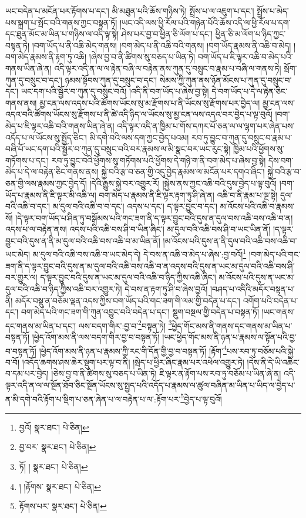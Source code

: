 ཡང་བདེན་པ་མངོན་པར་རྟོགས་པ་དང་། མི་མཐུན་པའི་ཆོས་གཉིས་ཏེ། སྤྲོས་པ་ལ་འཇུག་པ་དང་། སྤྲོས་པ་མེད་པས་སྐྲག་པ་སྤོང་བའི་གནས་ཀྱང་བསྟན་ཏོ། །ཡང་འདི་ལས་ཕྱི་རོལ་པའི་གཉེན་པོའི་ཆོས་འདི་ལ་ཕྱི་རོལ་པ་དག་དང་ཐུན་མོང་མ་ཡིན་པ་གཉིས་ལ་འདི་ལྟ་སྟེ། ཤེས་པར་བྱ་བ་ཕྱིན་ཅི་ལོག་པ་དང་། ཕྱིན་ཅི་མ་ལོག་པ་ཉིད་ཀྱང་བསྟན་ཏེ། །བག་ཡོད་པ་ནི་འཆི་མེད་གནས། །བག་མེད་པ་ནི་འཆི་བའི་གནས། །བག་ཡོད་རྣམས་ནི་འཆི་བ་མེད། །བག་མེད་རྣམས་ནི་རྟག་ཏུ་འཆི། །ཞེས་བྱ་བ་ནི་ཚིགས་སུ་བཅད་པ་ཡིན་ཏེ། བག་ཡོད་པ་ཇི་ལྟར་འཆི་བ་མེད་པའི་གནས་ཡིན་ཞེ་ན། འདི་ལྟར་འདི་ན་ལ་ལ་རྟེན་བཞི་ལ་བརྟེན་ནས་ཀུན་དུ་བསྲུང་བ་རྣམ་པ་བཞི་ལ་གནས་ཏེ། སྲོག་ཀུན་དུ་བསྲུང་བ་དང་། ཉམས་སྟོབས་ཀུན་དུ་བསྲུང་བ་དང་། སེམས་ཀྱི་ཀུན་ནས་ཉོན་མོངས་པ་ཀུན་དུ་བསྲུང་བ་དང་། ཡང་དག་པའི་སྦྱོར་བ་ཀུན་དུ་བསྲུང་བའོ། །འདི་ནི་བག་ཡོད་པ་ཞེས་བྱ་སྟེ། དེ་བག་ཡོད་པ་དེ་ལ་རྟེན་ཅིང་གནས་ནས། མྱ་ངན་ལས་འདས་པའི་ཚོགས་ཡོངས་སུ་མ་རྫོགས་པ་ནི་ཡོངས་སུ་རྫོགས་པར་བྱེད་ལ། མྱ་ངན་ལས་འདའ་བའི་ཚོགས་ཡོངས་སུ་རྫོགས་པ་ནི་ཚེ་འདི་ཉིད་ལ་ཡོངས་སུ་མྱ་ངན་ལས་འདའ་བར་བྱེད་པ་ལྟ་བུའོ། །བག་མེད་པ་ཇི་ལྟར་འཆི་བའི་གནས་ཡིན་ཞེ་ན། འདི་ལྟར་འདི་ན་ཁྱིམ་པ་གོས་དཀར་པོ་ཅན་ལ་ལ་ལྷག་པར་ཞེན་པས་འདོད་པ་ལ་ཡོངས་སུ་སྤྱོད་ཅིང་། མི་དགེ་བའི་ལས་དག་ཀྱང་བྱེད་པའམ། རབ་ཏུ་བྱུང་བ་ཀུན་དུ་བསྲུང་བ་རྣམ་པ་བཞི་པོ་ཡང་དག་པའི་སྦྱོར་བ་ཀུན་དུ་བསྲུང་བའི་བར་རྣམས་ལ་མི་སྣང་བར་ཡང་རུང་སྟེ། ཁྱིམ་པའི་ཕྱོགས་སུ་གཏོགས་པ་དང་། རབ་ཏུ་བྱུང་བའི་ཕྱོགས་སུ་གཏོགས་པའི་ཕྱོགས་དེ་གཉི་ག་ནི་བག་མེད་པ་ཞེས་བྱ་སྟེ། དེས་བག་མེད་པ་དེ་ལ་བརྟེན་ཅིང་གནས་ནས། སྐྱེ་བའི་རྩ་བ་ཅན་གྱི་འདུ་བྱེད་རྣམས་ལ་མངོན་པར་དགའ་ཞིང་། སྐྱེ་བའི་རྩ་བ་ཅན་གྱི་ལས་རྣམས་ཀྱང་བྱེད་དོ། །དེའི་རྒྱུས་སྐྱེ་བར་འགྱུར་རོ། །སྐྱེས་ནས་ཀྱང་འཆི་བའི་དུས་བྱེད་པ་ལྟ་བུའོ། །བག་ཡོད་པ་རྣམས་ནི་ཇི་ལྟར་མི་འཆི་ལ། བག་མེད་པ་རྣམས་ནི་ཇི་ལྟར་རྟག་ཏུ་ཤི་ཞེ་ན། འཆི་བ་ནི་རྣམ་པ་ལྔ་སྟེ། དུལ་བའི་འཆི་བ་དང་། མ་དུལ་བའི་འཆི་བ་བ་དང་། འདས་པ་དང་། ད་ལྟར་བྱུང་བ་དང་། མ་འོངས་པའི་འཆི་བ་རྣམས་སོ། །དེ་ལྟར་བག་ཡོད་པ་ཤིན་ཏུ་བསྒོམས་པའི་གང་ཟག་ནི་ད་ལྟར་བྱུང་བའི་དུས་ན་དུལ་བས་འཆི་བས་འཆི་བ་ན། འདས་པ་ལ་བརྟེན་ནས། འདས་པའི་འཆི་བས་ཤི་བ་ཡིན་ཞིང་། མ་དུལ་བའི་འཆི་བས་ཤི་བ་ཡང་ཡིན་ནོ། །ད་ལྟར་བྱུང་བའི་དུས་ན་ནི་མ་དུལ་བའི་འཆི་བས་འཆི་བ་མ་ཡིན་ནོ། །མ་འོངས་པའི་དུས་ན་ནི་དུལ་བའི་འཆི་བས་འཆི་བ་ཡང་མེད། མ་དུལ་བའི་འཆི་བས་འཆི་བ་ཡང་མེད་དེ། དེ་བས་ན་འཆི་བ་མེད་པ་ཞེས་:བྱ་བའོ།\footnote{བྱའོ།  སྣར་ཐང་།  པེ་ཅིན། } །བག་མེད་པའི་གང་ཟག་ནི་ད་ལྟར་བྱུང་བའི་དུས་ན་མ་དུལ་བའི་འཆི་བས་འཆི་བ་ན་འདས་བའི་དུས་ན་ཡང་མ་དུལ་བའི་འཆི་བས་ཤི་བར་གྱུར་ལ། ད་ལྟར་བྱུང་བའི་དུས་ན་ཡང་མ་དུལ་བའི་འཆི་བ་ཉིད་ཀྱིས་འཆི་ཞིང་། མ་འོངས་པའི་དུས་ན་ཡང་མ་དུལ་བའི་འཆི་བ་ཉིད་ཀྱིས་འཆི་བར་འགྱུར་ཏེ། དེ་བས་ན་རྟག་ཏུ་ཤི་བ་ཞེས་བྱའོ། །བཤད་པ་འདིའི་མདོར་བསྟན་པ་ནི། མདོར་བསྡུ་ན་བཅོམ་ལྡན་འདས་ཀྱིས་བག་ཡོད་པའི་གང་ཟག་གི་ལམ་གྱི་བདེན་པ་དང་། འགོག་པའི་བདེན་པ་དང་། བག་མེད་པའི་གང་ཟག་གི་ཀུན་འབྱུང་བའི་བདེན་པ་དང་། སྡུག་བསྔལ་གྱི་བདེན་པ་བསྟན་ཏོ། །ཡང་གནས་དང་གནས་མ་ཡིན་པ་དང་། ལས་བདག་གིར་:བྱ་བ་\footnote{བྱ་བར་  སྣར་ཐང་།  པེ་ཅིན། }བསྟན་ཏེ། \footnote{ཏོ། །   སྣར་ཐང་།  པེ་ཅིན། }ཕྱེད་གོང་མས་ནི་གནས་དང་གནས་མ་ཡིན་པ་བསྟན་ཏོ། །ཕྱེད་འོག་མས་ནི་ལས་བདག་གིར་བྱ་བ་བསྟན་ཏོ། །ཡང་ཕྱེད་གོང་མས་ནི་ཉན་པ་རྣམས་ལ་སྟོན་པའི་བྱ་བ་བསྟན་ཏོ། །ཕྱེད་འོག་མས་ནི་ཉན་པ་རྣམས་ཀྱི་རང་གི་དོན་གྱི་བྱ་བ་བསྟན་ཏོ། །རྟོག་\footnote{། །རྟོགས་  སྣར་ཐང་།  པེ་ཅིན། }པས་རབ་ཏུ་བཅོམ་པའི་སྐྱེ་བ་བོ། །འདོད་ཆགས་ཤས་ཆེར་སྡུག་པར་ལྟ་བ་ནི། །སྲེད་པ་ཕྱིར་ཞིང་རྣམ་པར་འཕེལ་འགྱུར་ཏེ། །དེས་ནི་དེ་ཡི་འཆིང་བ་དམ་པར་བྱེད། །ཅེས་བྱ་བ་ནི་ཚིགས་སུ་བཅད་པ་ཡིན་ཏེ། ཇི་ལྟར་ན་རྟོག་པས་རབ་ཏུ་བཅོམ་པ་ཡིན་ཞེ་ན། འདི་ལྟར་འདི་ན་ལ་ལ་སྔོན་ཐོབ་ཅིང་སྔོན་ཡོངས་སུ་སྤྱད་པའི་འདོད་པ་རྣམས་ལ་ཚུལ་བཞིན་མ་ཡིན་པ་ཡིད་ལ་བྱེད་པ་ན་མི་དགེ་བའི་རྟོག་པ་སྡིག་པ་ཅན་ཞེན་པ་ལ་བརྟེན་པ་ལ་:རྟོག་པར་\footnote{རྟོགས་པར་  སྣར་ཐང་།  པེ་ཅིན། }བྱེད་པ་ལྟ་བུའོ། 
